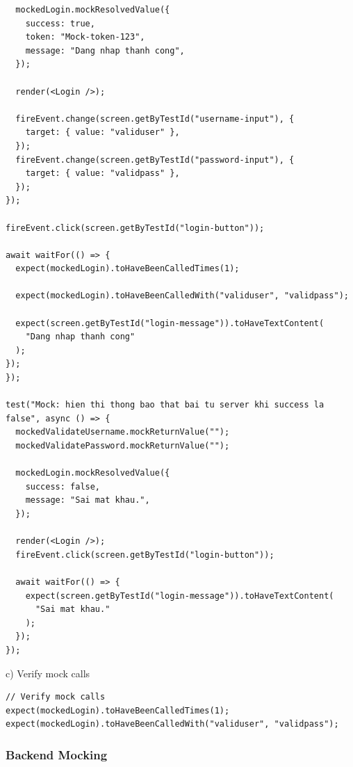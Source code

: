 \documentclass[a4paper,12pt]{article}
\begin{document}
{\begin{tcolorbox}[breakable, colback=green!5,colframe=black!50,title=Test Với Mocked Successful/Failed Responses ]
\begin{lstlisting}
  mockedLogin.mockResolvedValue({
    success: true,
    token: "Mock-token-123",
    message: "Dang nhap thanh cong",
  });

  render(<Login />);

  fireEvent.change(screen.getByTestId("username-input"), {
    target: { value: "validuser" },
  });
  fireEvent.change(screen.getByTestId("password-input"), {
    target: { value: "validpass" },
  });
});

fireEvent.click(screen.getByTestId("login-button"));

await waitFor(() => {
  expect(mockedLogin).toHaveBeenCalledTimes(1);

  expect(mockedLogin).toHaveBeenCalledWith("validuser", "validpass");

  expect(screen.getByTestId("login-message")).toHaveTextContent(
    "Dang nhap thanh cong"
  );
});
});

test("Mock: hien thi thong bao that bai tu server khi success la false", async () => {
  mockedValidateUsername.mockReturnValue("");
  mockedValidatePassword.mockReturnValue("");

  mockedLogin.mockResolvedValue({
    success: false,
    message: "Sai mat khau.",
  });

  render(<Login />);
  fireEvent.click(screen.getByTestId("login-button"));

  await waitFor(() => {
    expect(screen.getByTestId("login-message")).toHaveTextContent(
      "Sai mat khau."
    );
  });
});

\end{lstlisting}
\end{tcolorbox}
c) Verify mock calls
\begin{tcolorbox}[breakable, colback=green!5,colframe=black!50,title=Verify Mock Calls ]
\begin{lstlisting}
// Verify mock calls
expect(mockedLogin).toHaveBeenCalledTimes(1);
expect(mockedLogin).toHaveBeenCalledWith("validuser", "validpass");
\end{lstlisting}
\end{tcolorbox}
\subsubsection{Backend Mocking}

}
\end{document}
